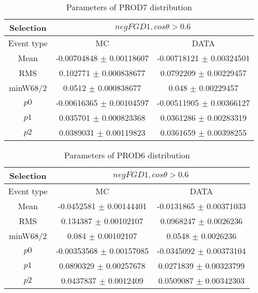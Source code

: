 \documentclass[a4paper,12pt]{article}
\begin{document}
\begin{table}[htbp]
\begin{center}
\begin{tabular}{|c|c|c|}
        \hline
        Selection & \multicolumn{2}{|c|}{$negFGD1, cos\theta>0.6$}  \\ \hline
        Event type & MC & DATA \\ 
        \hline
        Mean & -0.00704848 $\pm$ 0.00118607 & -0.00718121 $\pm$ 0.00324501 \\ 
        \hline 
        RMS & 0.102771 $\pm$ 0.000838677 & 0.0792209 $\pm$ 0.00229457 \\ 
        \hline 
        minW68/2 & 0.0512 $\pm$ 0.000838677 & 0.048 $\pm$ 0.00229457 \\ 
        \hline 
        $p0$ & -0.00616365 $\pm$ 0.00104597 & -0.00511905 $\pm$ 0.00366127 \\ 
        \hline 
        $p1$ & 0.035701 $\pm$ 0.000823368 & 0.0361286 $\pm$ 0.00283319 \\ 
        \hline 
        $p2$ & 0.0389031 $\pm$ 0.00119823 & 0.0361659 $\pm$ 0.00398255 \\ 
        \hline 
\end{tabular}
\caption{Parameters of PROD7 distribution } \vspace{0.2in}
\label{xxx}
\end{center}
\end{table}
\begin{table}[htbp]
\begin{center}
\begin{tabular}{|c|c|c|}
        \hline
        Selection & \multicolumn{2}{|c|}{$negFGD1, cos\theta>0.6$}  \\ \hline
        Event type & MC & DATA \\ 
        \hline
        Mean & -0.0452581 $\pm$ 0.00144401 & -0.0131865 $\pm$ 0.00371033 \\ 
        \hline 
        RMS & 0.134387 $\pm$ 0.00102107 & 0.0968247 $\pm$ 0.0026236 \\ 
        \hline 
        minW68/2 & 0.084 $\pm$ 0.00102107 & 0.0548 $\pm$ 0.0026236 \\ 
        \hline 
        $p0$ & -0.00353568 $\pm$ 0.00157085 & -0.0345092 $\pm$ 0.00373104 \\ 
        \hline 
        $p1$ & 0.0890329 $\pm$ 0.00257678 & 0.0271839 $\pm$ 0.00323799 \\ 
        \hline 
        $p2$ & 0.0437837 $\pm$ 0.0012409 & 0.0509087 $\pm$ 0.00342303 \\ 
        \hline 
\end{tabular}
\caption{Parameters of PROD6 distribution } \vspace{0.2in}
\label{xxx}
\end{center}
\end{table}
\end{document}
